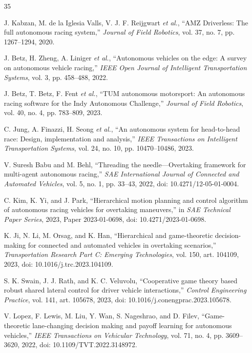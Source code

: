 \documentclass[final,5p,twocolumn]{elsarticle}
\begin{document}
\renewcommand{\bibfont}{\scriptsize}
\begin{thebibliography}{35}

J. Kabzan, M. de la Iglesia Valls, V. J. F. Reijgwart \emph{et al.},
``AMZ Driverless: The full autonomous racing system,''
\emph{Journal of Field Robotics}, vol. 37, no. 7, pp. 1267--1294, 2020.

J. Betz, H. Zheng, A. Liniger \emph{et al.},
``Autonomous vehicles on the edge: A survey on autonomous vehicle racing,''
\emph{IEEE Open Journal of Intelligent Transportation Systems}, vol. 3,
pp. 458--488, 2022.

J. Betz, T. Betz, F. Fent \emph{et al.},
``TUM autonomous motorsport: An autonomous racing software for the Indy
Autonomous Challenge,'' \emph{Journal of Field Robotics}, vol. 40, no. 4,
pp. 783--809, 2023.

C. Jung, A. Finazzi, H. Seong \emph{et al.},
``An autonomous system for head-to-head race: Design, implementation and
analysis,'' \emph{IEEE Transactions on Intelligent Transportation Systems},
vol. 24, no. 10, pp. 10470--10486, 2023.

V. Suresh Babu and M. Behl,
``Threading the needle---Overtaking framework for multi-agent autonomous
racing,'' \emph{SAE International Journal of Connected and Automated
Vehicles}, vol. 5, no. 1, pp. 33--43, 2022,
doi: 10.4271/12-05-01-0004.

C. Kim, K. Yi, and J. Park,
``Hierarchical motion planning and control algorithm of autonomous racing
vehicles for overtaking maneuvers,'' in \emph{SAE Technical Paper Series},
2023, Paper 2023-01-0698, doi: 10.4271/2023-01-0698.

K. Ji, N. Li, M. Orsag, and K. Han,
``Hierarchical and game-theoretic decision-making for connected and automated
vehicles in overtaking scenarios,'' \emph{Transportation Research Part C:
Emerging Technologies}, vol. 150, art. 104109, 2023,
doi: 10.1016/j.trc.2023.104109.

S. K. Swain, J. J. Rath, and K. C. Veluvolu,
``Cooperative game theory based robust shared lateral control for driver
vehicle interactions,'' \emph{Control Engineering Practice}, vol. 141,
art. 105678, 2023, doi: 10.1016/j.conengprac.2023.105678.

V. Lopez, F. Lewis, M. Liu, Y. Wan, S. Nageshrao, and D. Filev,
``Game-theoretic lane-changing decision making and payoff learning for
autonomous vehicles,'' \emph{IEEE Transactions on Vehicular Technology},
vol. 71, no. 4, pp. 3609--3620, 2022,
doi: 10.1109/TVT.2022.3148972.


\end{thebibliography}
\end{document}
